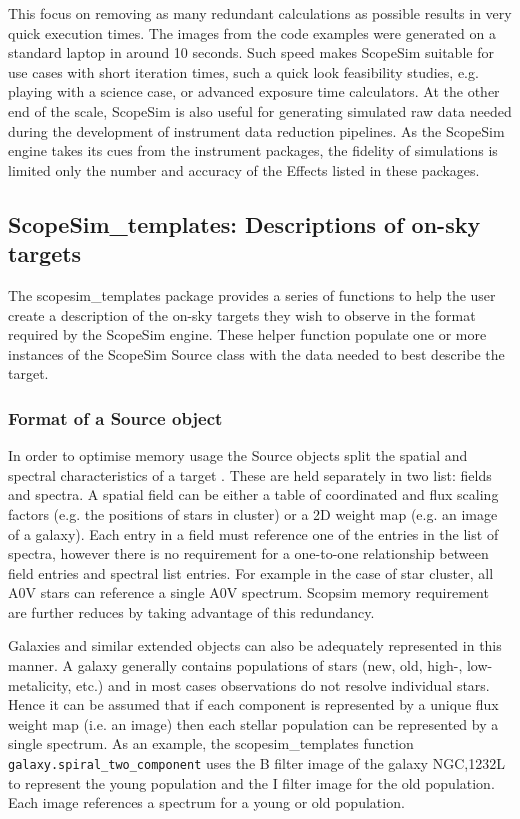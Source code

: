 This focus on removing as many redundant calculations as possible results in very quick execution times.
The images from the code examples were generated on a standard laptop in around 10 seconds.
Such speed makes ScopeSim suitable for use cases with short iteration times, such a quick look feasibility studies, e.g. \textquotedbl{}playing\textquotedbl{} with a science case, or advanced exposure time calculators.
At the other end of the scale, ScopeSim is also useful for generating simulated raw data needed during the development of instrument data reduction pipelines.
As the ScopeSim engine takes its cues from the instrument packages, the fidelity of simulations is limited only the number and accuracy of the Effects listed in these packages.


\subsection{ScopeSim\_templates: Descriptions of on-sky targets%
  \label{scopesim-templates-descriptions-of-on-sky-targets}%
}

The scopesim\_templates package provides a series of functions to help the user create a description of the on-sky targets they wish to observe in the format required by the ScopeSim engine.
These helper function populate one or more instances of the ScopeSim \textquotedbl{}Source\textquotedbl{} class with the data needed to best describe the target.


\subsubsection{Format of a Source object%
  \label{format-of-a-source-object}%
}

In order to optimise memory usage the Source objects split the spatial and spectral characteristics of a target \citep{schmalzl2012}.
These are held separately in two list: fields and spectra.
A spatial field can be either a table of coordinated and flux scaling factors (e.g. the positions of stars in cluster) or a 2D weight map (e.g. an image of a galaxy).
Each entry in a field must reference one of the entries in the list of spectra, however there is no requirement for a one-to-one relationship between field entries and spectral list entries.
For example in the case of star cluster, all A0V stars can reference a single A0V spectrum.
Scopsim memory requirement are further reduces by taking advantage of this redundancy.

Galaxies and similar extended objects can also be adequately represented in this manner.
A galaxy generally contains populations of stars (new, old, high-, low-metalicity, etc.) and in most cases observations do not resolve individual stars.
Hence it can be assumed that if each component is represented by a unique flux weight map (i.e. an image) then each stellar population can be represented by a single spectrum.
As an example, the scopesim\_templates function \texttt{galaxy.spiral\_two\_component} uses the B filter image of the galaxy NGC,1232L to represent the young population and the I filter image for the old population.
Each image references a spectrum for a young or old population.

